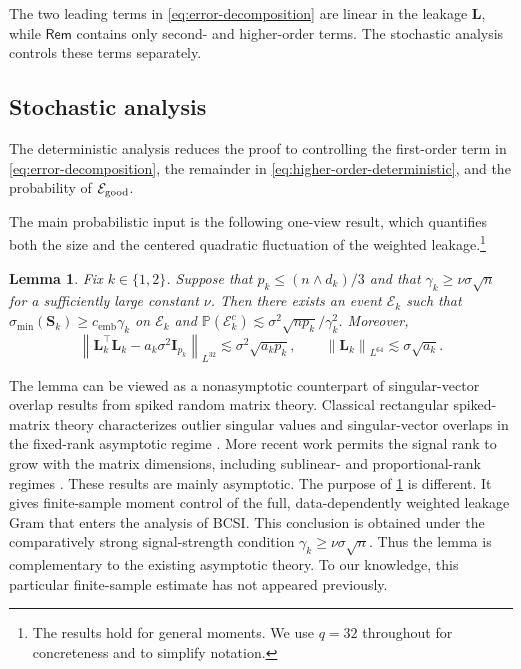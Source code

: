 \documentclass[11pt]{article}
\newtheorem{lemma}{Lemma}
\newcommand{\trans}{\top}
\newcommand{\Lqn}[2]{\left\lVert #1\right\rVert_{L^{#2}}}
\newcommand{\cE}{\mathcal{E}}
\newcommand{\cemb}{c_{\mathrm{emb}}}
\begin{document}
The two leading terms in \cref{eq:error-decomposition} are linear in the
leakage $\bm L$, while $\bm{\mathsf{Rem}}$ contains only second- and
higher-order terms.  The stochastic analysis controls these terms
separately.

\subsection{Stochastic analysis}
\label{sec:stochastic-analysis}

The deterministic analysis reduces the proof to controlling the first-order
term in \cref{eq:error-decomposition}, the remainder in
\cref{eq:higher-order-deterministic}, and the probability of
$\cE_{\rm good}$. 

The main probabilistic input is the following one-view
result, which quantifies both the size and the centered quadratic fluctuation
of the weighted leakage.\footnote{The results hold for general moments. We use $q = 32$ throughout for concreteness and to simplify notation. } 


\begin{lemma}
\label{lem:one-view}
Fix $k\in\{1,2\}$. 
Suppose that $p_k \leq (n \wedge d_k) / 3$ and that $\gamma_k \geq \nu \sigma \sqrt{n}$ for a sufficiently large constant $\nu$. Then there exists an event $\cE_k$ such that
$\sigma_{\min}(\bm S_k)\ge \cemb\gamma_k$ on $\cE_k$ and
$\mathbb P(\cE_k^c)\lesssim
\sigma^2\sqrt{np_k}/\gamma_k^2$.
Moreover,
\begin{equation}
\label{eq:one-view-bounds}
  \Lqn{
    \bm L_k^\trans\bm L_k-a_k\sigma^2\bm I_{p_k}
  }{32}
  \lesssim
  \sigma^2\sqrt{a_kp_k},
  \qquad
  \Lqn{\bm L_k}{64}
  \lesssim
  \sigma\sqrt{a_k}.
\end{equation}
\end{lemma}


The lemma can be viewed as a nonasymptotic counterpart of singular-vector
overlap results from spiked random matrix theory. Classical rectangular spiked-matrix theory characterizes outlier singular
values and singular-vector overlaps in the fixed-rank asymptotic regime
\citep{benaych2012singular,gavish2017optimal,bao2021singular}. More recent
work permits the signal rank to grow with the matrix dimensions, including
sublinear- and proportional-rank regimes
\citep{liu2025asymptotic,landau2023singular,shmalo2026mesoscopic}. These
results are mainly asymptotic.  
The purpose of \cref{lem:one-view} is different. It gives finite-sample moment
control of the full, data-dependently weighted leakage Gram that enters the
analysis of BCSI. This conclusion is obtained under the comparatively strong
signal-strength condition $\gamma_{k}\ge\nu\sigma\sqrt n$. Thus the lemma
is complementary to the existing asymptotic theory. To our knowledge, this particular finite-sample estimate
has not appeared previously.
\end{document}
